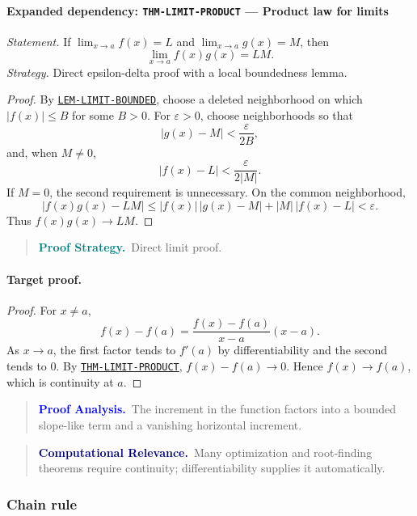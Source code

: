 \documentclass[10pt]{article}
\newcommand{\pidraw}[1]{\begingroup\urlstyle{tt}\nolinkurl{#1}\endgroup}
\newcommand{\pidref}[1]{\hyperref[prf:#1]{\pidraw{#1}}}
\newcommand{\pid}[1]{\pidref{#1}}
\theoremstyle{definition}
\theoremstyle{remark}
\newenvironment{proofstrategy}
{\begin{quote}\small\noindent\textbf{\textcolor{teal}{Proof Strategy.}}\ }
{\end{quote}}
\newenvironment{proofanalysis}
{\begin{quote}\small\noindent\textbf{\textcolor{blue}{Proof Analysis.}}\ }
{\end{quote}}
\newenvironment{computationalrelevance}
{\begin{quote}\small\noindent\textbf{\textcolor{navy}{Computational Relevance.}}\ }
{\end{quote}}
\begin{document}
\paragraph{Expanded dependency: \pidraw{THM-LIMIT-PRODUCT} --- Product law for limits}
\textit{Statement.} If $\lim_{x\to a}f(x)=L$ and $\lim_{x\to a}g(x)=M$, then
\[
\lim_{x\to a}f(x)g(x)=LM.
\]
\textit{Strategy.} Direct epsilon-delta proof with a local boundedness lemma.
\begin{proof}By \pid{LEM-LIMIT-BOUNDED}, choose a deleted neighborhood on which
$|f(x)|\le B$ for some $B>0$. For $\varepsilon>0$, choose neighborhoods so that
\[
|g(x)-M|<\frac{\varepsilon}{2B},
\]
and, when $M\ne0$,
\[
|f(x)-L|<\frac{\varepsilon}{2|M|}.
\]
If $M=0$, the second requirement is unnecessary. On the common neighborhood,
\[
|f(x)g(x)-LM|
\le |f(x)|\,|g(x)-M|+|M|\,|f(x)-L|<\varepsilon.
\]
Thus $f(x)g(x)\to LM$.\end{proof}

\begin{proofstrategy}Direct limit proof.\end{proofstrategy}

\paragraph{Target proof.}

\begin{proof}

For $x\ne a$,
\[
f(x)-f(a)=
\frac{f(x)-f(a)}{x-a}(x-a).
\]
As $x\to a$, the first factor tends to $f'(a)$ by differentiability and the
second tends to $0$. By \pid{THM-LIMIT-PRODUCT},
$f(x)-f(a)\to0$. Hence $f(x)\to f(a)$, which is continuity at $a$.

\end{proof}

\begin{proofanalysis}The increment in the function factors into a bounded slope-like term and a vanishing horizontal increment.\end{proofanalysis}

\begin{computationalrelevance}Many optimization and root-finding theorems require continuity; differentiability supplies it automatically.\end{computationalrelevance}

\subsubsection{Chain rule}
\end{document}

